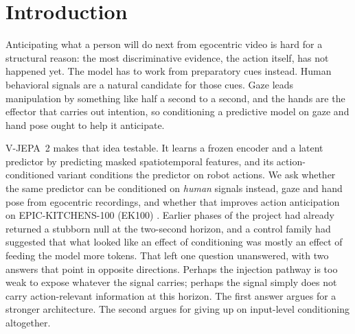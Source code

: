\section{Introduction}

Anticipating what a person will do next from egocentric video is hard for a
structural reason: the most discriminative evidence, the action itself, has not
happened yet. The model has to work from preparatory cues instead. Human
behavioral signals are a natural candidate for those cues. Gaze leads
manipulation by something like half a second to a second, and the hands are the
effector that carries out intention, so conditioning a predictive model on gaze
and hand pose ought to help it anticipate.

V-JEPA~2 \citep{assran2025vjepa2} makes that idea testable. It learns a frozen
encoder and a latent predictor by predicting masked spatiotemporal features, and
its action-conditioned variant conditions the predictor on robot actions. We ask
whether the same predictor can be conditioned on \emph{human} signals instead,
gaze and hand pose from egocentric recordings, and whether that improves action
anticipation on EPIC-KITCHENS-100 (EK100) \citep{damen2022ek100}. Earlier phases
of the project had already returned a stubborn null at the two-second horizon,
and a control family had suggested that what looked like an effect of
conditioning was mostly an effect of feeding the model more tokens. That left one
question unanswered, with two answers that point in opposite directions. Perhaps
the injection pathway is too weak to expose whatever the signal carries; perhaps
the signal simply does not carry action-relevant information at this horizon. The
first answer argues for a stronger architecture. The second argues for giving up
on input-level conditioning altogether.


